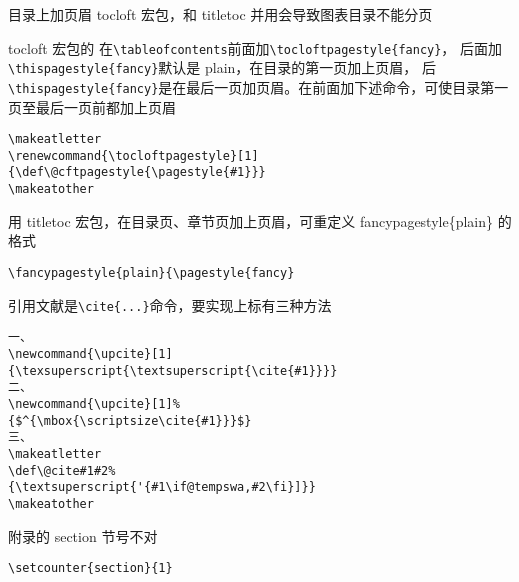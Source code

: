 \begin{list}
\item
\color{red}
目录上加页眉 tocloft 宏包，和 titletoc 并用会导致图表目录不能分页\\
\normalcolor

        tocloft 宏包的 在\verb$\tableofcontents$前面加\verb$\tocloftpagestyle{fancy}$，%
        后面加\verb$\thispagestyle{fancy}$默认是 plain，在目录的第一页加上页眉，%
        后\verb$\thispagestyle{fancy}$是在最后一页加页眉。在前面加下述命令，可使目录第一页至最后一页前都加上页眉

\begin{shaded}
\begin{Verbatim}
\makeatletter
\renewcommand{\tocloftpagestyle}[1]
{\def\@cftpagestyle{\pagestyle{#1}}}
\makeatother
\end{Verbatim}
\end{shaded}




\item
\color{red}
用 titletoc 宏包，在目录页、章节页加上页眉，可重定义 fancypagestyle\{plain\} 的格式\\
\normalcolor
\begin{shaded}
\begin{Verbatim}
\fancypagestyle{plain}{\pagestyle{fancy}
\end{Verbatim}
\end{shaded}



\item
\color{red}
引用文献是\verb|\cite{...}|命令，要实现上标有三种方法\\
\normalcolor
\begin{shaded}
\begin{Verbatim}
一、
\newcommand{\upcite}[1]
{\texsuperscript{\textsuperscript{\cite{#1}}}}
二、
\newcommand{\upcite}[1]%
{$^{\mbox{\scriptsize\cite{#1}}}$}
三、
\makeatletter
\def\@cite#1#2%
{\textsuperscript{'{#1\if@tempswa,#2\fi}]}}
\makeatother
\end{Verbatim}
\end{shaded}


\item
\color{red}
附录的 section 节号不对\\
\normalcolor
\begin{shaded}
\begin{Verbatim}
\setcounter{section}{1}
\end{Verbatim}
\end{shaded}


\end{list}
